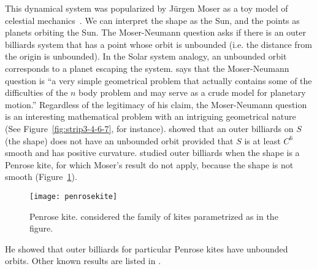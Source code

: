 \documentclass[10pt,twoside]{book}
\begin{document}
This dynamical system was popularized by Jürgen Moser as a toy model of celestial mechanics~\citep{moser,moserbook}.
We can interpret the shape as the Sun, and the points as planets orbiting the Sun.
The Moser-Neumann question asks if there is an outer billiards system that has a point whose orbit is unbounded (i.e. the distance from the origin is unbounded).
In the Solar system analogy, an unbounded orbit corresponds to a planet escaping the system.
\citet{moser} says that the Moser-Neumann question is
``a very simple geometrical problem that actually contains some of the difficulties of the $n$ body problem and may serve as a crude model for planetary motion.''
Regardless of the legitimacy of his claim, the Moser-Neumann question is an interesting mathematical problem with an intriguing geometrical nature (See Figure~\ref{fig:strip3-4-6-7}, for instance).
\citet{moserbook} showed that an outer billiards on $S$ (the shape) does not have an unbounded orbit provided that $S$ is at least $C^6$ smooth and has positive curvature. 
\citet{schwartz} studied outer billiards when the shape is a Penrose kite, for which Moser's result do not apply, because the shape is not smooth (Figure~\ref{fig:penrosekite}).
\begin{figure}[ht]
  \begin{center}
    \texttt{[image: penrosekite]}
    \caption{Penrose kite. \citet{schwartz} considered the family of kites parametrized as in the figure.}
    \label{fig:penrosekite}
  \end{center}
\end{figure}
He showed that outer billiards for particular Penrose kites have unbounded orbits.
Other known results are listed in \citet[p. 2]{schwartz}.
\end{document}
